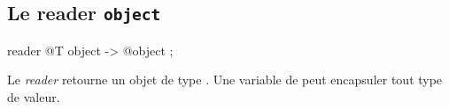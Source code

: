 \subsection{Le reader \texttt{object}}

\begin{galgascode}
reader @T object -> @object ;
\end{galgascode}


Le \emph{reader}  retourne un objet de type . Une variable de  peut encapsuler tout type de valeur.

%
%
%
%
%
%
%
%
%











